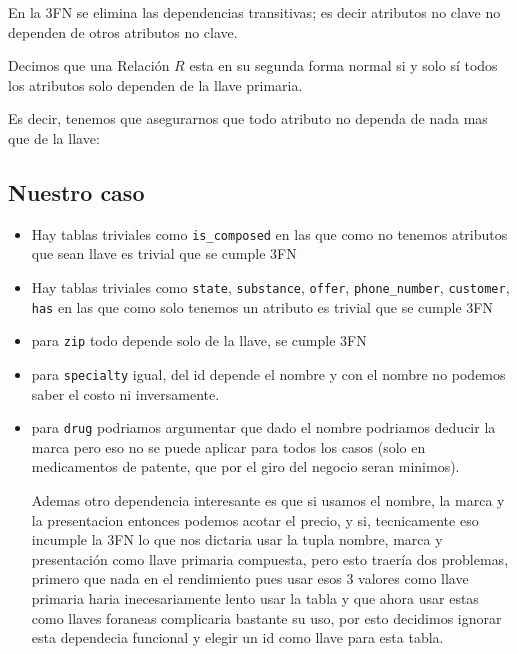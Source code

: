\documentclass[12pt, fleqn]{report}                             %
\theoremstyle{break}                                            %
\begin{document}
            En la 3FN se elimina las dependencias transitivas; es decir atributos no
            clave no dependen de otros atributos no clave.

            Decimos que una Relación $R$ esta en su segunda forma normal
            si y solo sí todos los atributos solo dependen de la llave primaria. 

            Es decir, tenemos que asegurarnos que todo atributo no dependa de nada mas que de la llave:

        \subsection{Nuestro caso}

            \begin{itemize}
                \item Hay tablas triviales como \texttt{is\_composed} en las que como 
                    no tenemos atributos que sean llave es trivial que se cumple 3FN
                \item Hay tablas triviales como \texttt{state}, \texttt{substance}, 
                \texttt{offer}, 
                \texttt{phone\_number}, 
                \texttt{customer}, 
                \texttt{has}
                 en las que como 
                    solo tenemos un atributo es trivial que se cumple 3FN
                \item para \texttt{zip} todo depende solo de la llave, se cumple 3FN
                \item para \texttt{specialty} igual, del id depende el nombre y con el nombre no podemos saber el costo
                ni inversamente.
                \item para \texttt{drug} podriamos argumentar que dado el nombre podriamos deducir la marca pero eso 
                no se puede aplicar para todos los casos (solo en medicamentos de patente, que por el giro del negocio
                seran minimos).

                Ademas otro dependencia interesante es que si usamos el nombre, la marca y la presentacion entonces 
                podemos acotar el precio, y si, tecnicamente eso incumple la 3FN lo que nos dictaria usar la tupla
                nombre, marca y presentación como llave primaria compuesta, pero esto traería dos problemas, primero que
                nada en el rendimiento pues usar esos 3 valores como llave primaria haria inecesariamente lento usar la tabla y
                que ahora usar estas como llaves foraneas complicaria bastante su uso, por esto decidimos ignorar esta dependecia funcional
                y elegir un id como llave para esta tabla.


\end{itemize}
\end{document}

